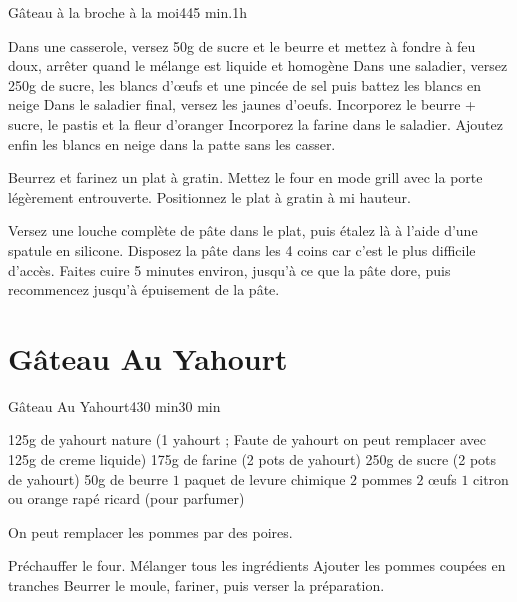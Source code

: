 {\begin{recette}{Gâteau à la broche à la moi}{4}{45 min.}{1h}
\begin{preparation}
\etape Dans une casserole, versez 50g de sucre et le beurre et mettez à fondre à feu doux, arrêter quand le mélange est liquide et homogène
\etape Dans une saladier, versez 250g de sucre, les blancs d'œufs et une pincée de sel puis battez les blancs en neige
\etape Dans le saladier final, versez les jaunes d'oeufs. Incorporez le beurre + sucre, le pastis et la fleur d'oranger
\etape Incorporez la farine dans le saladier. 
\etape Ajoutez enfin les blancs en neige dans la patte sans les casser. 
\end{preparation}

\begin{cuisson}
Beurrez et farinez un plat à gratin. Mettez le four en mode grill avec la porte légèrement entrouverte. Positionnez le plat à gratin à mi hauteur. 

Versez une louche complète de pâte dans le plat, puis étalez là à l'aide d'une spatule en silicone. Disposez la pâte dans les 
4 coins car c'est le plus difficile d'accès. Faites cuire 5 minutes 
environ, jusqu'à ce que la pâte dore, puis recommencez jusqu'à épuisement de la pâte. 
\end{cuisson}

\end{recette}
\section{Gâteau Au Yahourt}
\begin{recette}{Gâteau Au Yahourt}{4}{30 min}{30 min}

\begin{ingredients}
\ingredient 125g de yahourt nature (1 yahourt ; Faute de yahourt on peut remplacer avec 125g de creme liquide)
\ingredient 175g de farine (2 pots de yahourt)
\ingredient 250g de sucre (2 pots de yahourt)
\ingredient 50g de beurre
\ingredient $1$ paquet de levure chimique
\ingredient $2$ pommes
\ingredient $2$ œufs
\ingredient $1$ citron ou orange rapé
\ingredient ricard (pour parfumer)
\end{ingredients}

\begin{remarque}
On peut remplacer les pommes par des poires.
\end{remarque}

\begin{preparation}
\etape Préchauffer le four.
\etape Mélanger tous les ingrédients
\etape Ajouter les pommes coupées en tranches
\etape Beurrer le moule, fariner, puis verser la préparation.
\end{preparation}


\end{recette}}
